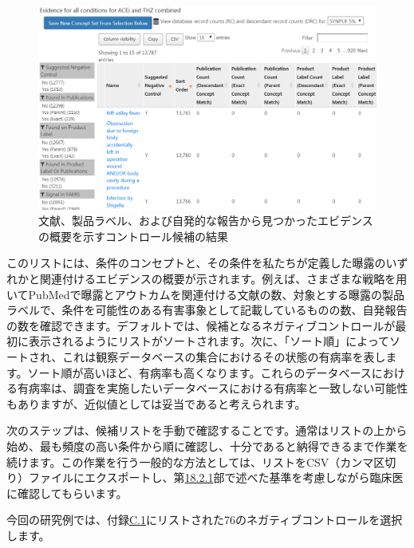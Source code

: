 \documentclass[
  11pt]{book}
\theoremstyle{definition}
\theoremstyle{definition}
\theoremstyle{definition}
\theoremstyle{definition}
\theoremstyle{remark}
\begin{document}
\begin{figure}

{\centering \includegraphics[width=1\linewidth]{images/MethodValidity/candidateNcs} 

}

\caption{文献、製品ラベル、および自発的な報告から見つかったエビデンスの概要を示すコントロール候補の結果}\label{fig:candidateNcs}
\end{figure}

このリストには、条件のコンセプトと、その条件を私たちが定義した曝露のいずれかと関連付けるエビデンスの概要が示されます。例えば、さまざまな戦略を用いてPubMedで曝露とアウトカムを関連付ける文献の数、対象とする曝露の製品ラベルで、条件を可能性のある有害事象として記載しているものの数、自発報告の数を確認できます。デフォルトでは、候補となるネガティブコントロールが最初に表示されるようにリストがソートされます。次に、「ソート順」によってソートされ、これは観察データベースの集合におけるその状態の有病率を表します。ソート順が高いほど、有病率も高くなります。これらのデータベースにおける有病率は、調査を実施したいデータベースにおける有病率と一致しない可能性もありますが、近似値としては妥当であると考えられます。

次のステップは、候補リストを手動で確認することです。通常はリストの上から始め、最も頻度の高い条件から順に確認し、十分であると納得できるまで作業を続けます。この作業を行う一般的な方法としては、リストをCSV（カンマ区切り）ファイルにエクスポートし、第\href{https://ohdsi.github.io/TheBookOfOhdsi/MethodValidity.html\#NegativeControls}{18.2.1}部で述べた基準を考慮しながら臨床医に確認してもらいます。

今回の研究例では、付録\href{https://ohdsi.github.io/TheBookOfOhdsi/NegativeControlsAppendix.html\#AceiThzNsc}{C.1}にリストされた76のネガティブコントロールを選択します。
\end{document}
